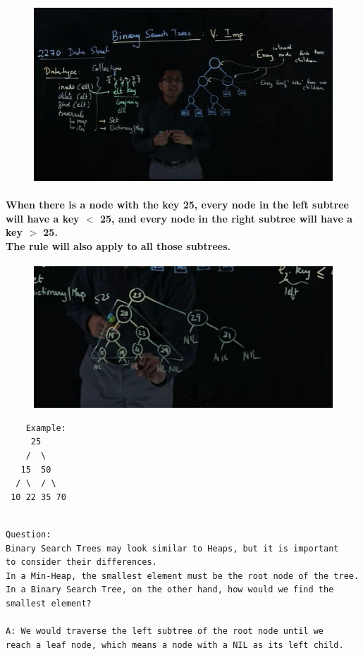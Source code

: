 \documentclass{article}
\begin{document}
\begin{figure}[H]
    \includegraphics[width=\textwidth]{binarysearchtreenodes.png}
\end{figure}

\paragraph{
    When there is a node with the key 25, every node in the left subtree
    will have a key $<$ 25, and every node in the right subtree will
    have a key $>$ 25.\\
    The rule will also apply to all those subtrees.\\
}

\begin{figure}[H]
    \includegraphics[width=\textwidth]{binarysearchtreerealexample.png}
\end{figure}

\begin{verbatim}
    Example:
     25
    /  \
   15  50
  / \  / \
 10 22 35 70
\end{verbatim}

\begin{verbatim}

Question:
Binary Search Trees may look similar to Heaps, but it is important 
to consider their differences.
In a Min-Heap, the smallest element must be the root node of the tree.
In a Binary Search Tree, on the other hand, how would we find the 
smallest element?

A: We would traverse the left subtree of the root node until we 
reach a leaf node, which means a node with a NIL as its left child.
\end{verbatim}
\end{document}
